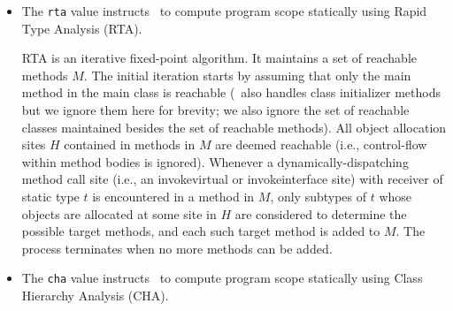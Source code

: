 \begin{itemize}
\begin{itemize}
\item
The {\tt rta} value instructs \Chord\ to compute program scope statically using Rapid Type Analysis (RTA).

RTA is an iterative fixed-point algorithm.  It maintains a set of reachable methods $M$.
The initial iteration starts by assuming that only the main method in the main class is reachable
(\Chord\ also handles class initializer methods but we ignore them here for brevity; we also ignore
the set of reachable classes maintained besides the set of reachable methods).
All object allocation sites $H$ contained in methods in $M$ are deemed
reachable (i.e., control-flow within method bodies is ignored).  Whenever a dynamically-dispatching
method call site (i.e., an invokevirtual or invokeinterface site) with receiver of static
type $t$ is encountered in a method in $M$, only subtypes of $t$ whose objects are allocated at some site in $H$
are considered to determine the possible target methods, and each such target
method is added to $M$.  The process terminates when no more methods can be added.

%
%
%
%
\item
The {\tt cha} value instructs \Chord\ to compute program scope statically using Class Hierarchy Analysis (CHA).


\end{itemize}
\end{itemize}
